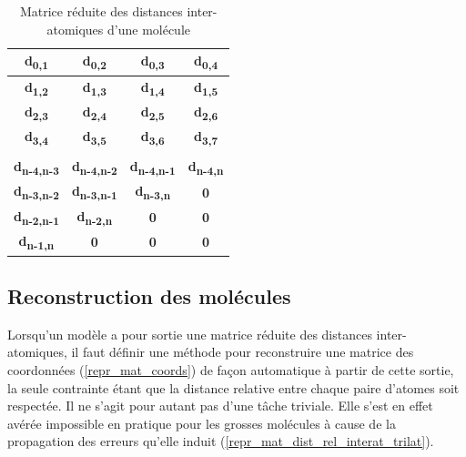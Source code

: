 \begin{table}
	\centering
	
	
	\begin{tabular}{|c|c|c|c|}
		\hline
		\textbf{d\textsubscript{0,1}} & \textbf{d\textsubscript{0,2}} & \textbf{d\textsubscript{0,3}} & \textbf{d\textsubscript{0,4}} \\ \hline
		\textbf{d\textsubscript{1,2}} & \textbf{d\textsubscript{1,3}} & \textbf{d\textsubscript{1,4}} & \textbf{d\textsubscript{1,5}} \\ \hline
		\textbf{d\textsubscript{2,3}} & \textbf{d\textsubscript{2,4}} & \textbf{d\textsubscript{2,5}} & \textbf{d\textsubscript{2,6}} \\ \hline
		\textbf{d\textsubscript{3,4}} & \textbf{d\textsubscript{3,5}} & \textbf{d\textsubscript{3,6}} & \textbf{d\textsubscript{3,7}} \\ \hline
		\textbf{\rot{... }} & \textbf{\rot{... }} & \textbf{\rot{... }} & \textbf{\rot{... }} \\ \hline
		\textbf{d\textsubscript{n-4,n-3}} & \textbf{d\textsubscript{n-4,n-2}} & \textbf{d\textsubscript{n-4,n-1}} & \textbf{d\textsubscript{n-4,n}} \\ \hline
		\textbf{d\textsubscript{n-3,n-2}} & \textbf{d\textsubscript{n-3,n-1}} & \textbf{d\textsubscript{n-3,n}} & \textbf{0} \\ \hline
		\textbf{d\textsubscript{n-2,n-1}} & \textbf{d\textsubscript{n-2,n}} & \textbf{0} & \textbf{0} \\ \hline
		\textbf{d\textsubscript{n-1,n}} & \textbf{0} & \textbf{0} & \textbf{0} \\ \hline
	\end{tabular}

	
	\caption{Matrice réduite des distances inter-atomiques d'une molécule}
	\label{table_mat_interat_2}
\end{table}

\newpage
\subsection{Reconstruction des molécules}

\label{repr_mat_dist_rel_interat_reconstruct}

\par Lorsqu'un modèle a pour sortie une matrice réduite des distances inter-atomiques, il faut définir une méthode pour reconstruire une matrice des coordonnées (\ref{repr_mat_coords}) de façon automatique à partir de cette sortie, la seule contrainte étant que la distance relative entre chaque paire d'atomes soit respectée. Il ne s'agit pour autant pas d'une tâche triviale. Elle s'est en effet avérée impossible en pratique pour les grosses molécules à cause de la propagation des erreurs qu'elle induit (\ref{repr_mat_dist_rel_interat_trilat}).


